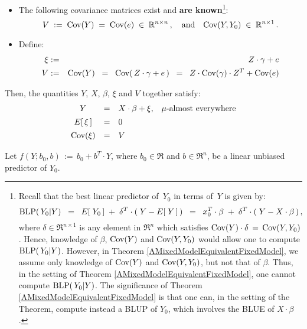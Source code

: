\begin{theorem}
\begin{itemize}
\begin{equation*}
	\end{equation*}
\item
	The following covariance matrices exist and \textbf{\color{red}are known}\footnote{Recall
		that the best linear predictor of \,$Y_{0}$ in terms of \,$Y$ is given by:
		\begin{equation*}
		\textnormal{BLP}(\,Y_{0}\vert Y)
		\;\; = \;\;
			E\!\left[\;Y_{0}\,\right] \; + \; \delta^{T}\cdot(\;Y - E\!\left[\;Y\,\right]\,)
		\;\; = \;\;
			x_{0}^{T}\cdot\beta \; + \; \delta^{T}\cdot(\;Y - X\cdot\beta\,)\,,
		\end{equation*}
		where $\delta \in \Re^{n \times 1}$ is any element in $\Re^{n}$ which satisfies
		$\textnormal{Cov}(Y) \cdot \delta \,=\, \textnormal{Cov}(Y,Y_{0})$.
		Hence, knowledge of $\beta$, $\textnormal{Cov}(Y)$ and $\textnormal{Cov}(Y,Y_{0})$ would allow one
		to compute $\textnormal{BLP}(\,Y_{0}\vert Y)$.
		However, in Theorem \ref{AMixedModelEquivalentFixedModel}, we assume
		only knowledge of $\textnormal{Cov}(Y)$ and $\textnormal{Cov}(Y,Y_{0})$, but not that of $\beta$.
		Thus, in the setting of Theorem \ref{AMixedModelEquivalentFixedModel},
		one cannot compute $\textnormal{BLP}(\,Y_{0}\vert Y)$.
		The significance of Theorem \ref{AMixedModelEquivalentFixedModel} is that
		one can, in the setting of the Theorem, compute instead a BLUP of $Y_{0}$,
		which involves the BLUE of $X\cdot\beta$.}:
	\begin{equation*}
	V \;:=\; \textnormal{Cov}(Y) \;=\; \textnormal{Cov}(e) \;\in\; \mathbb{R}^{n \times n}\,,
	\quad\textnormal{and}\quad
	\textnormal{Cov}(Y,Y_{0}) \;\in\; \mathbb{R}^{n \times 1}\,.
	\end{equation*}
\item
	Define:
	\begin{eqnarray*}
	\xi & := & Z \cdot \gamma + e
	\\
	V & := & \textnormal{Cov}(Y) \;\; = \;\; \textnormal{Cov}\!\left(\,Z\cdot\gamma+e\,\right) \;\; = \;\; Z \cdot \textnormal{Cov}(\gamma) \cdot Z^{T} + \textnormal{Cov}(e)
	\end{eqnarray*}
\end{itemize}
Then, the quantities $Y$, $X$, $\beta$, $\xi$ and $V$ together satisfy:
	\begin{equation*}
	\begin{array}{ccll}
	Y & = & X \cdot \beta + \xi, & \textnormal{$\mu$-almost everywhere}
	\\
	E\!\left[\,\xi\,\right] &\overset{{\color{white}\vert}}{=}& 0
	\\
	\Cov\!\left(\xi\right) &\overset{{\color{white}\vert}}{=}& V
	\end{array}
	\end{equation*}
\end{theorem}
\proof
Let $f(Y;b_{0},b) \,:=\, b_{0} + b^{T}\cdot Y$, where $b_{0} \in \Re$ and $b \in \Re^{n}$, be a linear unbiased predictor of $Y_{0}$.

